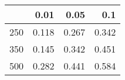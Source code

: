 % 
\begin{tabular}{rrrr}
  \hline
 & 0.01 & 0.05 & 0.1 \\ 
  \hline
250 & 0.118 & 0.267 & 0.342 \\ 
  350 & 0.145 & 0.342 & 0.451 \\ 
  500 & 0.282 & 0.441 & 0.584 \\ 
   \hline
\end{tabular}
